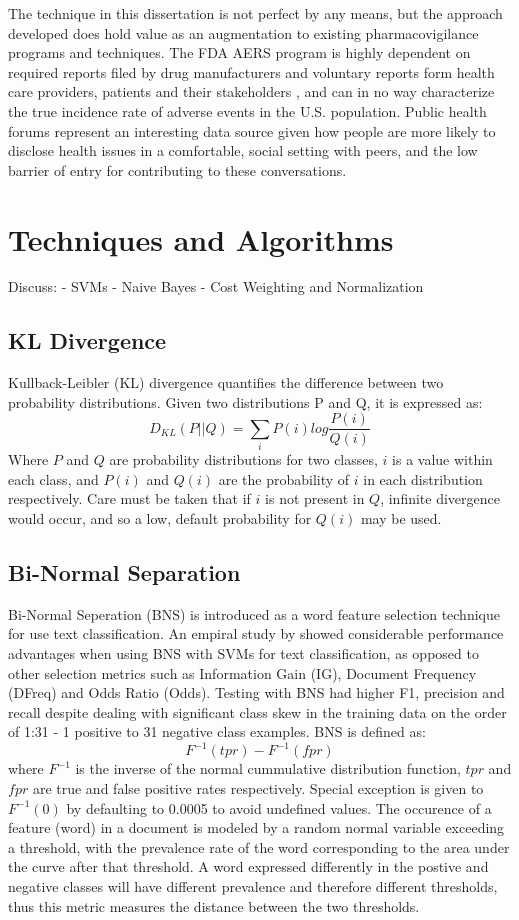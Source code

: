 \documentclass[twoside,11pt]{article}
\begin{document}
The technique in this dissertation is not perfect by any means, but the approach developed does hold value as an augmentation to existing pharmacovigilance programs and techniques. The FDA AERS program is highly dependent on required reports filed by drug manufacturers and voluntary reports form health care providers, patients and their stakeholders \citep{FDA Aers}, and can in no way characterize the true incidence rate of adverse events in the U.S. population. Public health forums represent an interesting data source given how people are more likely to disclose health issues in a comfortable, social setting with peers, and the low barrier of entry for contributing to these conversations.


\section{Techniques and Algorithms}

Discuss:
   - SVMs
   - Naive Bayes
  - Cost Weighting and Normalization

\subsection{KL Divergence}
Kullback-Leibler (KL) divergence quantifies the difference between two probability distributions. Given two distributions P and Q, it is expressed as:
\[
  D_{KL}(P||Q) = \sum_{i}P(i)log\frac{P(i)}{Q(i)}
\]
Where $P$ and $Q$ are probability distributions for two classes, $i$ is a value within each class, and $P(i)$ and $Q(i)$ are the probability of $i$ in each distribution respectively. Care must be taken that if $i$ is not present in $Q$, infinite divergence would occur, and so a low, default probability for $Q(i)$ may be used.


\subsection{Bi-Normal Separation}
Bi-Normal Seperation (BNS) is introduced as a word feature selection technique for use text classification. An empiral study by \citep{Forman} showed considerable performance advantages when using BNS with SVMs for text classification, as opposed to other selection metrics such as Information Gain (IG), Document Frequency (DFreq) and Odds Ratio (Odds). Testing with BNS had higher F1, precision and recall despite dealing with significant class skew in the training data on the order of 1:31 - 1 positive to 31 negative class examples. BNS is defined as:
\[
  F^{-1}(tpr) - F^{-1}(fpr)
\]
where $F^{-1}$ is the inverse of the normal cummulative distribution function, $tpr$ and $fpr$ are true and false positive rates respectively. Special exception is given to $F^{-1}(0)$ by defaulting to 0.0005 to avoid undefined values. The occurence of a feature (word) in a document is modeled by a random normal variable exceeding a threshold, with the prevalence rate of the word corresponding to the area under the curve after that threshold. A word expressed differently in the postive and negative classes will have different prevalence and therefore different thresholds, thus this metric measures the distance between the two thresholds.
\end{document}
